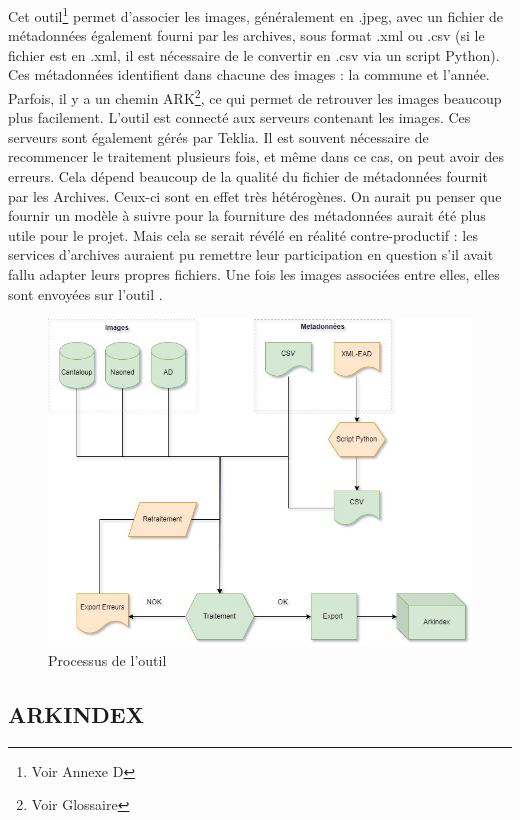 Cet outil\footnote{Voir Annexe D} permet d’associer les images, généralement en .jpeg, avec un fichier de métadonnées également fourni par les archives, sous format .xml ou .csv (si le fichier est en .xml, il est nécessaire de le convertir en .csv via un script Python). Ces métadonnées identifient dans chacune des images : la commune et l’année. Parfois, il y a un chemin \gls{ARK}\footnote{Voir Glossaire}, ce qui permet de retrouver les images beaucoup plus facilement.  
L’outil \Spider{} est connecté aux serveurs contenant les images. Ces serveurs sont également gérés par Teklia. Il est souvent nécessaire de recommencer le traitement plusieurs fois, et même dans ce cas, on peut avoir des erreurs. Cela dépend beaucoup de la qualité du fichier de métadonnées fournit par les Archives. Ceux-ci sont en effet très hétérogènes. On aurait pu penser que fournir un modèle à suivre pour la fourniture des métadonnées aurait été plus utile pour le projet. Mais cela se serait révélé en réalité contre-productif : les services d’archives auraient pu remettre leur participation en question s’il avait fallu adapter leurs propres fichiers. 
Une fois les images associées entre elles, elles sont envoyées sur l’outil \Arkindex{}.

\begin{figure}[H]
        \centering
        \includegraphics[width=0.8\linewidth]{Figures/Partie 1/Fig.1.5 - Processus Spider.jpg}
        \caption[Processus de l'outil \Spider{}]{Processus de l'outil \Spider{}}
        \label{fig:Fig1.5}
    \end{figure}

        \subsection{ARKINDEX}

